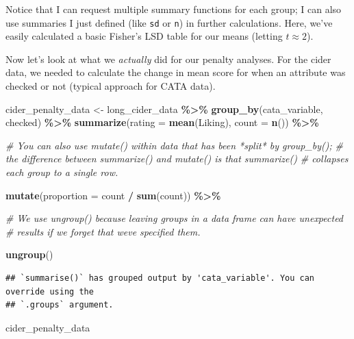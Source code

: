 \documentclass[
]{book}
\newenvironment{Shaded}{\begin{snugshade}}{\end{snugshade}}
\newcommand{\AttributeTok}[1]{\textcolor[rgb]{0.13,0.29,0.53}{#1}}
\newcommand{\CommentTok}[1]{\textcolor[rgb]{0.56,0.35,0.01}{\textit{#1}}}
\newcommand{\FunctionTok}[1]{\textcolor[rgb]{0.13,0.29,0.53}{\textbf{#1}}}
\newcommand{\NormalTok}[1]{#1}
\newcommand{\OtherTok}[1]{\textcolor[rgb]{0.56,0.35,0.01}{#1}}
\newcommand{\SpecialCharTok}[1]{\textcolor[rgb]{0.81,0.36,0.00}{\textbf{#1}}}
\begin{document}
Notice that I can request multiple summary functions for each group; I can also use summaries I just defined (like \texttt{sd} or \texttt{n}) in further calculations. Here, we've easily calculated a basic Fisher's LSD table for our means (letting \(t\approx2\)).

Now let's look at what we \emph{actually} did for our penalty analyses. For the cider data, we needed to calculate the change in mean score for when an attribute was checked or not (typical approach for CATA data).

\begin{Shaded}
\begin{Highlighting}[]
\NormalTok{cider\_penalty\_data }\OtherTok{\textless{}{-}} 
\NormalTok{  long\_cider\_data }\SpecialCharTok{\%\textgreater{}\%}
  \FunctionTok{group\_by}\NormalTok{(cata\_variable, checked) }\SpecialCharTok{\%\textgreater{}\%}
  \FunctionTok{summarize}\NormalTok{(}\AttributeTok{rating =} \FunctionTok{mean}\NormalTok{(Liking),}
            \AttributeTok{count =} \FunctionTok{n}\NormalTok{()) }\SpecialCharTok{\%\textgreater{}\%}
  
  \CommentTok{\# You can also use mutate() within data that has been *split* by group\_by();}
  \CommentTok{\# the difference between summarize() and mutate() is that summarize()}
  \CommentTok{\# collapses each group to a single row.}
  
  \FunctionTok{mutate}\NormalTok{(}\AttributeTok{proportion =}\NormalTok{ count }\SpecialCharTok{/} \FunctionTok{sum}\NormalTok{(count)) }\SpecialCharTok{\%\textgreater{}\%}

  \CommentTok{\# We use ungroup() because leaving groups in a data frame can have unexpected}
  \CommentTok{\# results if we forget that we\textquotesingle{}ve specified them.}
  
  \FunctionTok{ungroup}\NormalTok{()}
\end{Highlighting}
\end{Shaded}

\begin{verbatim}
## `summarise()` has grouped output by 'cata_variable'. You can override using the
## `.groups` argument.
\end{verbatim}

\begin{Shaded}
\begin{Highlighting}[]
\NormalTok{cider\_penalty\_data}
\end{Highlighting}
\end{Shaded}
\end{document}
